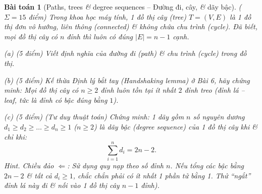\documentclass{article}
\newtheorem{baitoan}{Bài toán}
\begin{document}
\begin{baitoan}[Paths, trees {\it\&} degree sequences -- Đường đi, cây, {\it\&} dãy bậc]
	{\rm($\Sigma = 15$ điểm)} Trong khoa học máy tính, 1 đồ thị cây (tree) $T = (V, E)$ là 1 đồ thị đơn vô hướng, liên thông (connected) \& không chứa chu trình (cycle). Đã biết, mọi đồ thị cây có $n$ đỉnh thì luôn có đúng $|E| = n - 1$ cạnh.	
	\item(a) {\rm(5 điểm)} Viết định nghĩa của đường đi (path) \& chu trình (cycle) trong đồ thị.
	\item(b) {\rm(5 điểm)} Kế thừa Định lý bắt tay (Handshaking lemma) ở Bài 6, hãy chứng minh: Mọi đồ thị cây có $n \ge 2$ đỉnh luôn tồn tại ít nhất $2$ đỉnh treo (đỉnh lá -- leaf, tức là đỉnh có bậc đúng bằng $1$).
	\item(c) {\rm(5 điểm)} \emph{(Tư duy thuật toán)} Chứng minh: 1 dãy gồm $n$ số nguyên dương $d_1\ge d_2\ge\ldots\ge d_n\ge1$ ($n \ge 2$) là dãy bậc (degree sequence) của 1 đồ thị cây khi \& chỉ khi:
	\begin{equation*}
		\sum_{i = 1}^n d_i = 2n - 2.
	\end{equation*}
	{\sf Hint.} Chiều đảo $\Leftarrow$: Sử dụng quy nạp theo số đỉnh $n$. Nếu tổng các bậc bằng $2n - 2$ \& tất cả $d_i \ge 1$, chắc chắn phải có ít nhất 1 phần tử bằng 1. Thử ``ngắt'' đỉnh lá này đi \& nối vào 1 đồ thị cây $n-1$ đỉnh).
\end{baitoan}


\printbibliography[heading=bibintoc]
\end{document}
